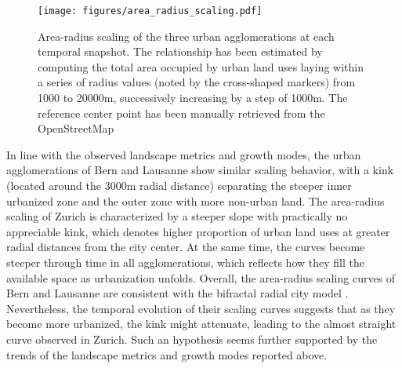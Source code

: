 \documentclass[10pt,letterpaper]{article}
\begin{document}
\begin{figure}[ht]
  \begin{adjustwidth}{-.4\textwidth}{0cm}
    \centering
    \texttt{[image: figures/area\_radius\_scaling.pdf]}
    \vspace{.5em}
    \caption[Area-radius scaling]{\label{figures/area_radius_scaling.pdf}Area-radius scaling of the three urban agglomerations at each temporal snapshot. The relationship has been estimated by computing the total area occupied by urban land uses laying within a series of radius values (noted by the cross-shaped markers) from 1000 to 20000m, successively increasing by a step of 1000m. The reference center point has been manually retrieved from the OpenStreetMap\footnotemark} %
  \end{adjustwidth}
\end{figure}


In line with the observed landscape metrics and growth modes, the urban agglomerations of Bern and Lausanne show similar scaling behavior, with a kink (located around the 3000m radial distance) separating the steeper inner urbanized zone and the outer zone with more non-urban land.
The area-radius scaling of Zurich is characterized by a steeper slope with practically no appreciable kink, which denotes higher proportion of urban land uses at greater radial distances from the city center.
At the same time, the curves become steeper through time in all agglomerations, which reflects how they fill the available space as urbanization unfolds.
Overall, the area-radius scaling curves of Bern and Lausanne are consistent with the bifractal radial city model \cite{white2015modeling}.
Nevertheless, the temporal evolution of their scaling curves suggests that as they become more urbanized, the kink might attenuate, leading to the almost straight curve observed in Zurich.
Such an hypothesis seems further supported by the trends of the landscape metrics and growth modes reported above.

\end{document}
